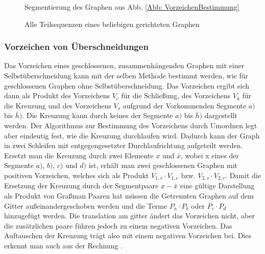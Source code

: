 \begin{figure}
    \begin{subfigure}[c]{0.3\textwidth}
    
    \end{subfigure}
    \hspace{0.2\textwidth}
    \begin{subfigure}[c]{0.3\textwidth}
    
    \end{subfigure}
    \caption{Segmentierung des Graphen aus Abb. \ref{Abb: VorzeichenBestimmung}}
    \label{Abb: Segmentierung}
\end{figure}

\begin{figure}[h!]
    \centering
    
    \caption{Alle Teilsequenzen eines beliebigen gerichteten Graphen }
    \label{Abb: directedElemets}
\end{figure}


\subsubsection{Vorzeichen von Überschneidungen}

Das Vorzeichen eines geschlossenen, zusammenhängenden Graphen mit einer Selbstüberschneidung kann mit der selben Methode bestimmt werden, wie für geschlossenen Graphen ohne Selbstüberschneidung. Das Vorzeichen ergibt sich dann als Produkt des Vorzeichens $V_c$ für die Schließung, des Vorzeichens $V_k$ für die Kreuzung und des Vorzeichens $V_s$ aufgrund der Vorkommenden Segmente $a)$ bis $\bar h)$. Die Kreuzung kann durch keines der Segmente $a)$ bis $\bar h)$ dargestellt werden. Der Algorithmus zur Bestimmung des Vorzeichens durch Umordnen legt aber eindeutig fest, wie die Kreuzung durchlaufen wird. Dadurch kann der Graph in zwei Schleifen mit entgegengesetzter Durchlaufrichtung aufgeteilt werden. Ersetzt man die Kreuzung durch zwei Elemente $x$ und $\bar x$, wobei x eines der Segmente  $a)$, $b)$, $c)$ und $d)$ ist, erhält man zwei geschlossenen Graphen mit positiven Vorzeichen, welches sich als Produkt $V_{1,s}\cdot V_{1,c}$ bzw. $V_{2,s}\cdot V_{2,c}$. Damit die Ersetzung der Kreuzung durch der Segmentpaare $x-\bar x$ eine gültige Darstellung als Produkt von Graßman Paaren hat müssen die Getrennten Graphen auf dem Gitter außeinandergeschoben werden und die Terme $P_a \cdot P_b$ oder $P_c \cdot P_d$ hinzugefügt werden. Die translation am gitter ändert das Vorzeichen nicht, aber die zusätzlichen paare führen jedoch zu einem negativen Vorzeichen. Das Auftauschen der Kreuzung trägt also mit einem negativen Vorzeichen bei. Dies erkennt man auch aus der Rechnung . 

